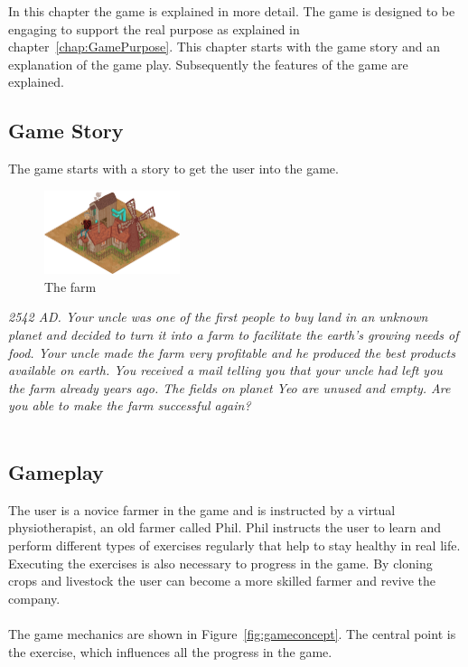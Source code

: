 
In this chapter the game is explained in more detail. The game is designed to be engaging to support the real purpose as explained in chapter~\ref{chap:GamePurpose}. This chapter starts with the game story and an explanation of the game play. Subsequently the features of the game are explained. 

\subsection{Game Story}
The game starts with a story to get the user into the game. 
\\
\begin{figure}
  \vspace{-30pt}
	\begin{center}
		\includegraphics[width=150px]{images/farm.png}
	\end{center}
  \vspace{-10pt}
	\caption{The farm}
  \vspace{-20pt}
	\label{fig:farm}
\end{figure}
\textit{2542 AD. Your uncle was one of the first people to buy land in an unknown planet and decided to turn it into a farm to facilitate the earth's growing needs of food. Your uncle made the farm very profitable and he produced the best products available on earth. You received a mail telling you that your uncle had left you the farm already years ago. The fields on planet Yeo are unused and empty. Are you able to make the farm successful again?}
\\\\
\subsection{Gameplay}
The user is a novice farmer in the game and is instructed by a virtual physiotherapist, an old farmer called Phil. Phil instructs the user to learn and perform different types of exercises regularly that help to stay healthy in real life. Executing the exercises is also necessary to progress in the game. By cloning crops and livestock the user can become a more skilled farmer and revive the company. 
\\\\
The game mechanics are shown in Figure~\ref{fig:gameconcept}. The central point is the exercise, which influences all the progress in the game.

